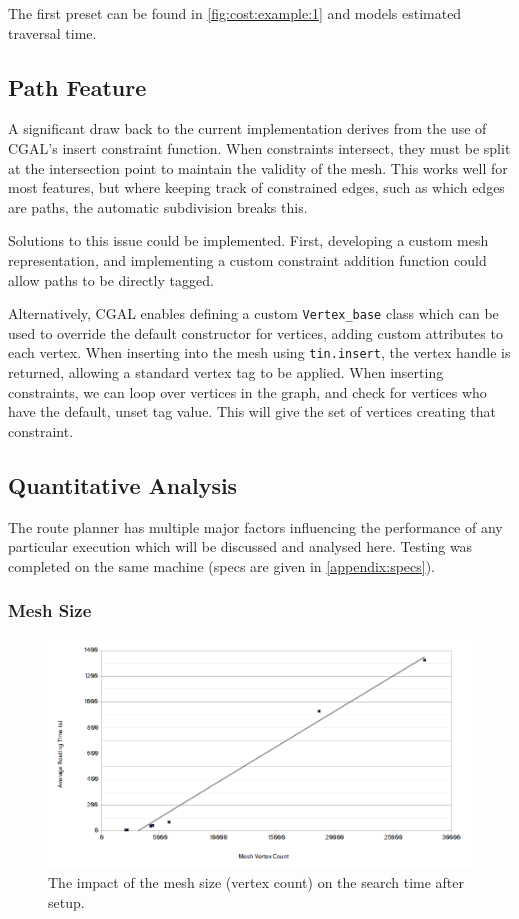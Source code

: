 \documentclass[12pt]{article}
\begin{document}
The first preset can be found in \autoref{fig:cost:example:1} and models estimated traversal time.

\subsection{Path Feature}

A significant draw back to the current implementation derives from the use of CGAL's insert constraint function. When constraints intersect, they must be split at the intersection point to maintain the validity of the mesh. This works well for most features, but where keeping track of constrained edges, such as which edges are paths, the automatic subdivision breaks this.

Solutions to this issue could be implemented. First, developing a custom mesh representation, and implementing a custom constraint addition function could allow paths to be directly tagged.

Alternatively, CGAL enables defining a custom \texttt{Vertex\_base} class which can be used to override the default constructor for vertices, adding custom attributes to each vertex. When inserting into the mesh using \texttt{tin.insert}, the vertex handle is returned, allowing a standard vertex tag to be applied. When inserting constraints, we can loop over vertices in the graph, and check for vertices who have the default, unset tag value. This will give the set of vertices creating that constraint.

\subsection{Quantitative Analysis}


The route planner has multiple major factors influencing the performance of any particular execution which will be discussed and analysed here. Testing was completed on the same machine (specs are given in \autoref{appendix:specs}).

\subsubsection{Mesh Size}

\begin{figure}[H]
  \centering
  \includegraphics[width=\textwidth]{assets/searchtime-vertices.png}
  \caption{The impact of the mesh size (vertex count) on the search time after setup.}
  \label{fig:eval:vertices}
\end{figure}
\end{document}
